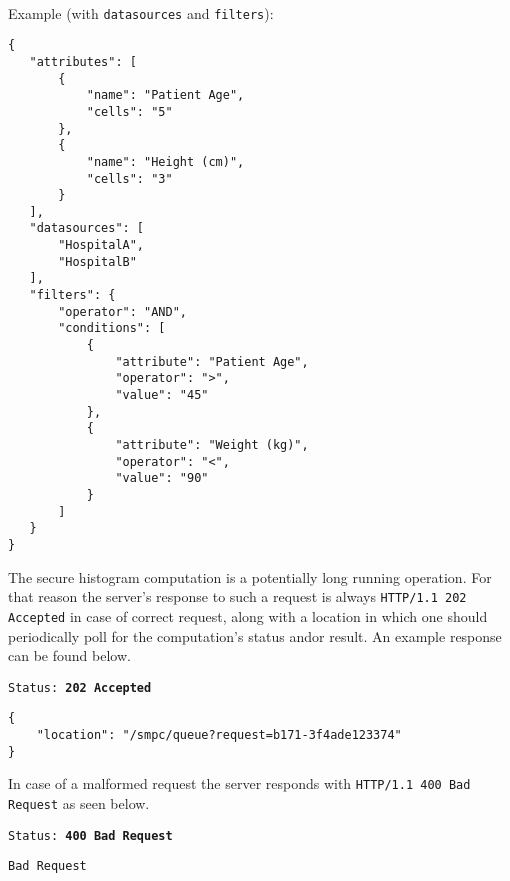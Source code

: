 \begin{description}[labelwidth=5em, leftmargin=\dimexpr\labelwidth+\labelsep\relax]
\ \\
 \begin{minipage}{\linewidth}
   Example (with \texttt{datasources} and \texttt{filters}):
 {
 \begin{verbatim}
{
   "attributes": [
       {
           "name": "Patient Age",
           "cells": "5"
       },
       {
           "name": "Height (cm)",
           "cells": "3"
       }
   ],
   "datasources": [
       "HospitalA",
       "HospitalB"
   ],
   "filters": {
       "operator": "AND",
       "conditions": [
           {
               "attribute": "Patient Age",
               "operator": ">",
               "value": "45"
           },
           {
               "attribute": "Weight (kg)",
               "operator": "<",
               "value": "90"
           }
       ]
   }
}
 \end{verbatim}
 \label{sc:histogram-numerical-post-2}
 }
\end{minipage}

\item[Response:] The secure histogram computation is a potentially long running operation. For that reason the server's response to such a request is always \texttt{HTTP/1.1 202 Accepted} in case of correct request, along with a location in which one should periodically poll for the computation's status and\myslash or result. An example response can be found below.
\ \\

\begin{minipage}{\linewidth}
{
\texttt{Status: {\color{ForestGreen}\textbf{202 Accepted}}}
\begin{verbatim}
{
    "location": "/smpc/queue?request=b171-3f4ade123374"
}
\end{verbatim}
\label{sc:histogram-numerical-response-1}
}
\end{minipage}

In case of a malformed request the server responds with \texttt{HTTP/1.1 400 Bad Request} as seen below.\\

\begin{minipage}{\linewidth}
{
\texttt{Status: {\color{BrickRed}\textbf{400 Bad Request}}}
\begin{verbatim}
Bad Request
\end{verbatim}
\label{sc:histogram-numerical-response-2}
}
\end{minipage}

 \end{description}



